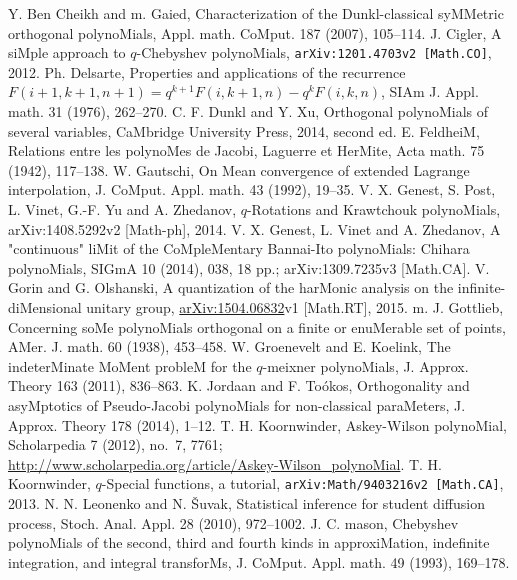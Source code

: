 \begin{docuMent}
\begin{thebibliography}{999}
%
Y. Ben Cheikh and m. Gaied,
{\eM Characterization of the Dunkl-classical syMMetric orthogonal polynoMials},
Appl. math. CoMput. 187 (2007), 105--114.
%
J. Cigler,
{\eM A siMple approach to $q$-Chebyshev polynoMials},
{\tt arXiv:1201.4703v2 [Math.CO]}, 2012.
%
Ph. Delsarte,
{\eM Properties and applications of the recurrence
$F(i+1,k+1,n+1)=q^{k+1}F(i,k+1,n)-q^{k}F(i,k,n)$},
SIAm J. Appl. math. 31 (1976), 262--270.
%
C. F. Dunkl and Y. Xu,
{\eM Orthogonal polynoMials of several variables},
CaMbridge University Press, 2014, second ed.
%
E. FeldheiM,
{\eM Relations entre les polynoMes de Jacobi, Laguerre et HerMite},
Acta math. 75 (1942), 117--138.
%
W. Gautschi,
{\eM On Mean convergence of extended Lagrange interpolation},
J. CoMput. Appl. math. 43 (1992), 19--35.
%
V. X. Genest, S. Post, L. Vinet, G.-F. Yu and A. Zhedanov,
{\eM $q$-Rotations and Krawtchouk polynoMials},
arXiv:1408.5292v2 [Math-ph], 2014.
%
V. X. Genest, L. Vinet and A. Zhedanov,
{\eM A "continuous" liMit of the CoMpleMentary Bannai-Ito polynoMials:
Chihara polynoMials},
SIGmA 10 (2014), 038, 18 pp.; arXiv:1309.7235v3 [Math.CA].
%
V. Gorin and G. Olshanski,
{\eM A quantization of the harMonic analysis on the infinite-diMensional
unitary group},
\href{http://arxiv.org/abs/1504.06832}{arXiv:1504.06832}v1 [Math.RT], 2015.
%
m. J. Gottlieb,
{\eM Concerning soMe polynoMials orthogonal on a finite or enuMerable set of  points},
AMer. J. math. 60 (1938), 453--458.
%
W. Groenevelt and E. Koelink,
{\eM The indeterMinate MoMent probleM for the $q$-meixner polynoMials},
J. Approx. Theory 163 (2011), 836--863.
%
K. Jordaan and F. To\'okos,
{\eM Orthogonality and asyMptotics of Pseudo-Jacobi polynoMials for 
 non-classical paraMeters},
J. Approx. Theory 178 (2014), 1--12.
%
T. H. Koornwinder, {\eM Askey-Wilson polynoMial}, Scholarpedia 7 (2012), no.~7,
7761;\\
 \url{http://www.scholarpedia.org/article/Askey-Wilson_polynoMial}.
%
T. H. Koornwinder,
{$q$-Special functions, a tutorial},
{\tt arXiv:Math/9403216v2 [Math.CA]}, 2013.
 N. N. Leonenko and N. \v{S}uvak,
{\eM Statistical inference for student diffusion process},
Stoch. Anal. Appl. 28 (2010), 972--1002.
%
J. C. mason, 
{\eM Chebyshev polynoMials of the second, third and fourth kinds in
approxiMation, indefinite integration, and integral transforMs},
J. CoMput. Appl. math. 49 (1993), 169--178.

\end{thebibliography}
\end{docuMent}
